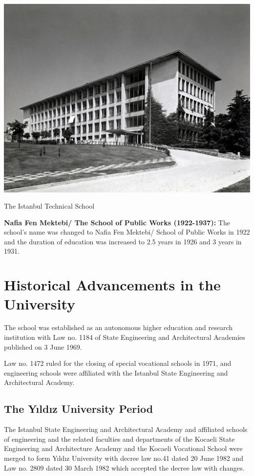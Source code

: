 \begin{map}[!htbp]
\centering
\includegraphics[width=\textwidth]{thesisChapters/images/Picture2}
\caption{The Istanbul Technical School}
\label{fig:itu}
\end{map}

\textbf{Nafia Fen Mektebi/ The School of Public Works (1922-1937):}  The school’s name was changed to Nafia Fen Mektebi/ School of Public Works in 1922 and the duration of education was increased to 2.5 years in 1926 and 3 years in 1931.

\section{Historical Advancements in the University}

The school was established as an autonomous higher education and research institution with Law no. 1184 of State Engineering and Architectural Academies published on 3 June 1969. 

Law no. 1472 ruled for the closing of special vocational schools in 1971, and engineering schools were affiliated with the Istanbul State Engineering and Architectural Academy.

\subsection{The Yıldız University Period}
The Istanbul State Engineering and Architectural Academy and affiliated schools of engineering and the related faculties and departments of the Kocaeli State Engineering and Architecture Academy and the Kocaeli Vocational School were merged to form Yıldız University with decree law no.41 dated 20 June 1982 and Law no. 2809 dated 30 March 1982 which accepted the decree law with changes.

